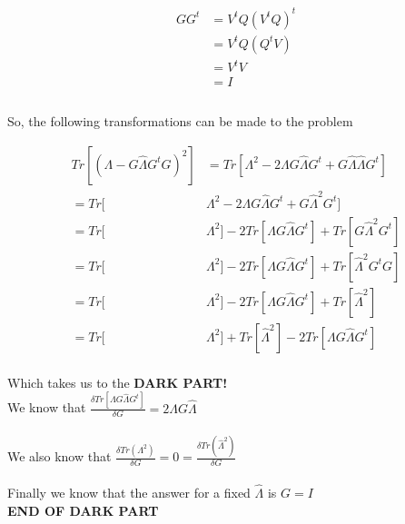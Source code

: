 \documentclass[12pt,journal]{IEEEtran}
\begin{document}
    \begin{equation*}
        \begin{aligned}
            GG^t &= V^tQ (V^tQ)^t\\
                 &= V^tQ (Q^tV)\\
                 &= V^tV\\
                 &= I\\ \\
        \end{aligned}
    \end{equation*}

    So, the following transformations can be made to the problem

    \begin{equation*}
        \begin{aligned}
        Tr[(\Lambda - G \hat{\Lambda} G^t G)^2 ]
        &=
        Tr[\Lambda^2 - 2 \Lambda G \hat{\Lambda} G^t + G \hat{\Lambda} \hat{\Lambda} G^t]\\
        =
        Tr[&\Lambda^2 - 2 \Lambda G \hat{\Lambda} G^t + G \hat{\Lambda}^2 G^t]\\
        =
        Tr[&\Lambda^2]- 2 Tr[\Lambda G \hat{\Lambda} G^t] + Tr[G \hat{\Lambda}^2 G^t]\\
        =
        Tr[&\Lambda^2] - 2 Tr[\Lambda G \hat{\Lambda} G^t] + Tr[ \hat{\Lambda}^2 G^tG]\\
        =
        Tr[&\Lambda^2] - 2 Tr[\Lambda G \hat{\Lambda} G^t] + Tr[ \hat{\Lambda}^2]\\
        =
        Tr[&\Lambda^2] + Tr[ \hat{\Lambda}^2] - 2 Tr[\Lambda G \hat{\Lambda} G^t]\\
        \end{aligned}
    \end{equation*}

    Which takes us to the \textbf{DARK PART!}\\

    We know that $\frac{\delta Tr[\Lambda G \hat{\Lambda} G^t]}{\delta G} = 2\Lambda G \hat{\Lambda}$\\\\
    We also know that $\frac{\delta Tr(\Lambda^2)}{\delta G} = 0 = \frac{\delta Tr(\hat{\Lambda}^2)}{\delta G}$\\\\
    Finally we know that the answer for a fixed $\hat{\Lambda}$ is $G=I$\\

    \textbf{END OF DARK PART}\\
\end{document}
